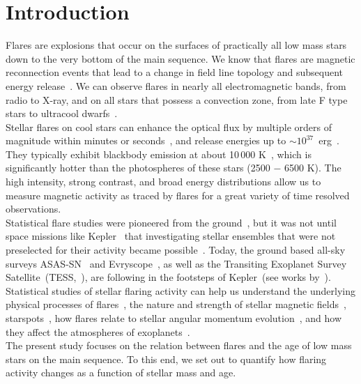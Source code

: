 \documentclass{aa}
\begin{document}
\section{Introduction}
Flares are explosions that occur on the surfaces of practically all low mass stars down to the very bottom of the main sequence. We know that flares are magnetic reconnection events that lead to a change in field line topology and subsequent energy release~\citep{priest_magnetic_2002}. We can observe flares in nearly all electromagnetic bands, from radio
to X-ray, and on all stars that possess a convection zone, from late F type stars to ultracool dwarfs~\citep{schaefer2000,benz2010,gizis2013}. 
\\
Stellar flares on cool stars can enhance the optical flux by multiple orders of magnitude within minutes or seconds~\citep{haisch1991, schmidt2019}, and release energies up to \mbox{$\sim10^{37}$ erg}~\citep{maehara2012, davenport_kepler_2016}. They typically exhibit blackbody emission at about 10\,000 K~\citep{hawley1992, kowalski2013}, which is significantly hotter than the photospheres of these stars (2500 $-$ 6500 K). The high intensity, strong contrast, and broad energy distributions allow us to measure magnetic activity as traced by flares for a great variety of time resolved observations.
\\
Statistical flare studies were pioneered from the ground~\citep{lacy_uv_1976}, but it was not until space missions like Kepler~\citep{koch2010} that investigating stellar ensembles that were not preselected for their activity became possible~\citep{walkowicz2011}. Today, the ground based all-sky surveys ASAS-SN~\citep{shappee2014} and Evryscope~\citep{law2015}, as well as the Transiting Exoplanet Survey Satellite~(TESS,~\citealt{ricker2014}), are following in the footsteps of Kepler~(see works by~\citealt{schmidt2019,rodriguez2020,howard2019, howard2020, guenther2020, feinstein2020}). Statistical studies of stellar flaring activity can help us understand the underlying physical processes of flares~\citep{benz2010}, the nature and strength of stellar magnetic fields~\citep{berger2006, odert2017}, starspots~\citep{davenport_flaresandspots_2015, notsu2019, howard2020}, how flares relate to stellar angular momentum evolution~\citep{mondrik2019, howard2020}, and how they affect the atmospheres of exoplanets~\citep{lecavelier_flareescape_2012, loyd_mflaresplanetsfuv_2018, tilley_repeated_flare_2019, howard2019}.
\\
The present study focuses on the relation between flares and the age of low mass stars on the main sequence. To this end, we set out to quantify how flaring activity changes as a function of stellar mass and age. 
\end{document}
